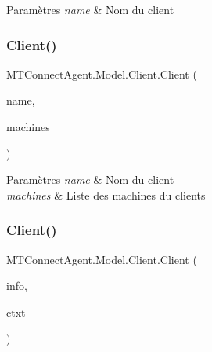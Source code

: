 \begin{DoxyParams}{Paramètres}
{\em name} & Nom du client\\
\hline
\end{DoxyParams}
\mbox{\label{class_m_t_connect_agent_1_1_model_1_1_client_ac519ea113d1eae1e94b96052c6ccfec6}} 
\subsubsection{\texorpdfstring{Client()}{Client()}\hspace{0.1cm}{\footnotesize\ttfamily [2/3]}}
{\footnotesize\ttfamily M\+T\+Connect\+Agent.\+Model.\+Client.\+Client (\begin{DoxyParamCaption}\item[{string}]{name,  }\item[{List$<$ \mbox{\hyperlink{class_m_t_connect_agent_1_1_model_1_1_machine}{Machine}} $>$}]{machines }\end{DoxyParamCaption})\hspace{0.3cm}{\ttfamily [inline]}}






\begin{DoxyParams}{Paramètres}
{\em name} & Nom du client\\
\hline
{\em machines} & Liste des machines du clients\\
\hline
\end{DoxyParams}
\mbox{\label{class_m_t_connect_agent_1_1_model_1_1_client_a1418f6bce9620188070855acae02aaeb}} 
\subsubsection{\texorpdfstring{Client()}{Client()}\hspace{0.1cm}{\footnotesize\ttfamily [3/3]}}
{\footnotesize\ttfamily M\+T\+Connect\+Agent.\+Model.\+Client.\+Client (\begin{DoxyParamCaption}\item[{Serialization\+Info}]{info,  }\item[{Streaming\+Context}]{ctxt }\end{DoxyParamCaption})\hspace{0.3cm}{\ttfamily [inline]}}



